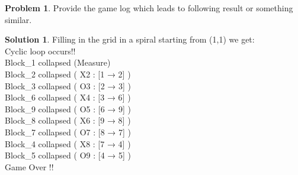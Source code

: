 \documentclass[10pt]{article}
\theoremstyle{definition}
\newtheorem{problem}{Problem}
\newtheorem{soln}{Solution}
\begin{document}
\begin{problem}
  Provide the game log which leads to following result or something similar.
\end{problem}
\begin{soln} Filling in the grid in a spiral starting from (1,1) we get: \\
Cyclic loop occurs!!\\
Block\_1 collapsed (Measure)\\
Block\_2 collapsed ( X2 : [1 → 2] )\\
Block\_3 collapsed ( O3 : [2 → 3] )\\
Block\_6 collapsed ( X4 : [3 → 6] )\\
Block\_9 collapsed ( O5 : [6 → 9] )\\
Block\_8 collapsed ( X6 : [9 → 8] )\\
Block\_7 collapsed ( O7 : [8 → 7] )\\
Block\_4 collapsed ( X8 : [7 → 4] )\\
Block\_5 collapsed ( O9 : [4 → 5] )\\
Game Over !!
\end{soln}
\end{document}
